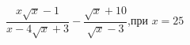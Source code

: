 \begin{ex}[type=simplify_calculate]
	\begin{condition}
		\( \dfrac{x\sqrt{x}-1}{x-4\sqrt{x}+3}-\dfrac{\sqrt{x}+10}{\sqrt{x}-3} \),\quad при \( x=25 \)
	\end{condition}
\end{ex}